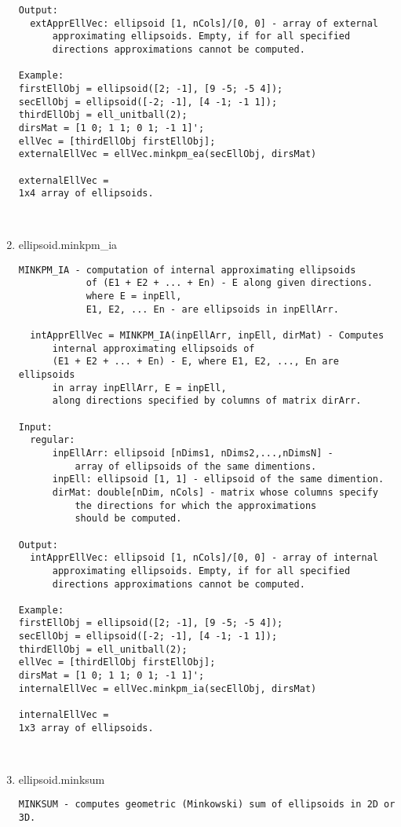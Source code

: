 \begin{enumerate}
\begin{lstlisting}
Output:
  extApprEllVec: ellipsoid [1, nCols]/[0, 0] - array of external
      approximating ellipsoids. Empty, if for all specified
      directions approximations cannot be computed.

Example:
firstEllObj = ellipsoid([2; -1], [9 -5; -5 4]);
secEllObj = ellipsoid([-2; -1], [4 -1; -1 1]);
thirdEllObj = ell_unitball(2);
dirsMat = [1 0; 1 1; 0 1; -1 1]';
ellVec = [thirdEllObj firstEllObj];
externalEllVec = ellVec.minkpm_ea(secEllObj, dirsMat)

externalEllVec =
1x4 array of ellipsoids.



\end{lstlisting}
\fontfamily{\familydefault}
\selectfont
\item {ellipsoid.minkpm\_ia}
\selectfont
\begin{lstlisting}
MINKPM_IA - computation of internal approximating ellipsoids
            of (E1 + E2 + ... + En) - E along given directions.
            where E = inpEll,
            E1, E2, ... En - are ellipsoids in inpEllArr.

  intApprEllVec = MINKPM_IA(inpEllArr, inpEll, dirMat) - Computes
      internal approximating ellipsoids of
      (E1 + E2 + ... + En) - E, where E1, E2, ..., En are ellipsoids
      in array inpEllArr, E = inpEll,
      along directions specified by columns of matrix dirArr.

Input:
  regular:
      inpEllArr: ellipsoid [nDims1, nDims2,...,nDimsN] -
          array of ellipsoids of the same dimentions.
      inpEll: ellipsoid [1, 1] - ellipsoid of the same dimention.
      dirMat: double[nDim, nCols] - matrix whose columns specify
          the directions for which the approximations
          should be computed.

Output:
  intApprEllVec: ellipsoid [1, nCols]/[0, 0] - array of internal
      approximating ellipsoids. Empty, if for all specified
      directions approximations cannot be computed.

Example:
firstEllObj = ellipsoid([2; -1], [9 -5; -5 4]);
secEllObj = ellipsoid([-2; -1], [4 -1; -1 1]);
thirdEllObj = ell_unitball(2);
ellVec = [thirdEllObj firstEllObj];
dirsMat = [1 0; 1 1; 0 1; -1 1]';
internalEllVec = ellVec.minkpm_ia(secEllObj, dirsMat)

internalEllVec =
1x3 array of ellipsoids.



\end{lstlisting}
\fontfamily{\familydefault}
\selectfont
\item {ellipsoid.minksum}
\selectfont
\begin{lstlisting}
MINKSUM - computes geometric (Minkowski) sum of ellipsoids in 2D or 3D.


\end{lstlisting}
\end{enumerate}
